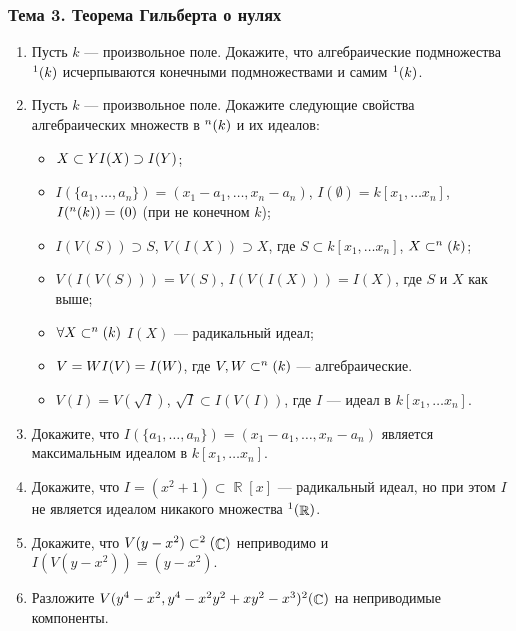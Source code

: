 \documentclass[a4paper, 12pt]{article}
\let\iff\relax
\DeclareMathOperator{\iff}{\Leftrightarrow}
\let\implies\relax
\DeclareMathOperator{\implies}{\Rightarrow}
\DeclareMathOperator{\RR}{\mathbb{R}}
\DeclareMathOperator{\CC}{\mathbb{C}}
\let\AA\relax
\DeclareMathOperator{\AA}{\mathbb{A}}
\begin{document}
\subsubsection{Тема 3. Теорема Гильберта о нулях}

\begin{enumerate}[noitemsep,topsep=0pt]
    \item Пусть $k$ --- произвольное поле. Докажите, что алгебраические подмножества $\AA^1(k)$ исчерпываются конечными подмножествами и самим $\AA^1(k)$. %
    \item Пусть $k$ --- произвольное поле. Докажите следующие свойства алгебраических множеств в $\AA^n(k)$ и их идеалов: 
    \begin{itemize}[noitemsep,topsep=0pt]
        \item $X \subset Y \implies I(X) \supset I(Y)$;
        \item $I(\{a_1, \dots, a_n\}) = (x_1-a_1, \dots, x_n-a_n)$, $I(\emptyset) = k[x_1, \dots x_n]$, $I(\AA^n(k)) = (0)$ (при не конечном $k$);
        \item $I(V(S)) \supset S$, $V(I(X)) \supset X$, где $S \subset k[x_1, \dots x_n]$, $X \subset \AA^n(k)$;
        \item $V(I(V(S))) = V(S)$, $I(V(I(X))) = I(X)$, где $S$ и $X$ как выше;
        \item $\forall X \subset \AA^n(k)$ $I(X)$ --- радикальный идеал;
        \item $V = W \iff I(V)=I(W)$, где $V,W \subset \AA^n(k)$ --- алгебраические. 
        \item $V(I) = V(\sqrt{I})$, $\sqrt{I} \subset I(V(I))$, где $I$ --- идеал в $k[x_1, \dots x_n]$.
    \end{itemize}
    \item Докажите, что $I(\{a_1, \dots, a_n\}) = (x_1-a_1, \dots, x_n-a_n)$ является максимальным идеалом в $k[x_1, \dots x_n]$. %
    \item Докажите, что $I=(x^2+1) \subset \RR[x]$ --- радикальный идеал, но при этом $I$ не является идеалом никакого множества $\AA^1(\RR)$. %
    \item Докажите, что $V(y-x^2)\subset \AA^2(\CC)$ неприводимо и $I(V(y-x^2)) = (y-x^2)$. %
    \item Разложите $V(y^4-x^2, y^4-x^2y^2+xy^2-x^3) \AA^2(\CC)$ на неприводимые компоненты. %
\end{enumerate}
\end{document}
